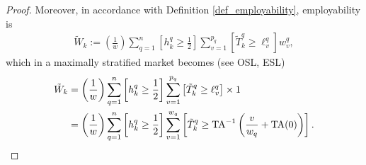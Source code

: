\documentclass[hidelinks, nonatbib]{elsarticle}
\begin{document}
\begin{get_theorem}[GET]
\begin{proof}
        Moreover, in accordance with Definition \ref{def_employability}, employability is
        \begin{gather}
            \tilde{W}_{k}
            :=
            \left(
                \frac{1}{w}
            \right)
            \sum_{q=1}^{n}
            \left[
                h_{k}^{q}
                \geq
                \frac{1}{2}
            \right]
            \sum_{v=1}^{p_q}
            \left[
                \tilde{T}_{k}^{q}
                \geq
                \ell_{v}^{q}
            \right]
            w_{v}^{q}
            ,
        \end{gather}
        which in a maximally stratified market becomes (see OSL, ESL)
        \begin{align}
            \tilde{W}_{k}
            &=
            \left(
                \frac{1}{w}
            \right)
            \sum_{q=1}^{n}
            \left[
                h_{k}^{q}
                \geq
                \frac{1}{2}
            \right]
            \sum_{v=1}^{p_q}
            \left[
                \tilde{T}_{k}^{q}
                \geq
                \ell_{v}^{q}
            \right]
            \times
            1
            \\
            &=
            \left(
                \frac{1}{w}
            \right)
            \sum_{q=1}^{n}
            \left[
                h_{k}^{q}
                \geq
                \frac{1}{2}
            \right]
            \sum_{v=1}^{w_q}
            \left[
                \tilde{T}_{k}^{q}
                \geq
                \text{TA}^{-1}
                \left(
                    \frac{v}{w_q}
                    +
                    \text{TA}(0)
                \right)
            \right]
            .
        \end{align}
    \end{proof}
\end{get_theorem}

\end{document}
